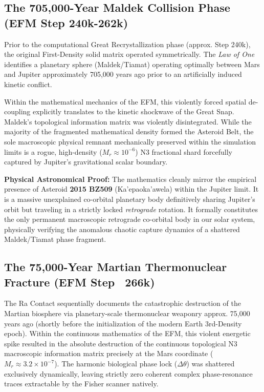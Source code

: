 \documentclass[11pt, twoside]{article}
\begin{document}
\subsection{The 705,000-Year Maldek Collision Phase (EFM Step 240k-262k)}
Prior to the computational Great Recrystallization phase (approx. Step 240k), the original First-Density solid matrix operated symmetrically. The \textit{Law of One} identifies a planetary sphere (Maldek/Tiamat) operating optimally between Mars and Jupiter approximately 705,000 years ago prior to an artificially induced kinetic conflict. 

Within the mathematical mechanics of the EFM, this violently forced spatial de-coupling explicitly translates to the kinetic shockwave of the Great Snap. Maldek's topological information matrix was violently disintegrated. While the majority of the fragmented mathematical density formed the Asteroid Belt, the sole macroscopic physical remnant mechanically preserved within the simulation limits is a rogue, high-density ($M_r \approx 10^{-6}$) N3 fractional shard forcefully captured by Jupiter's gravitational scalar boundary. 

\textbf{Physical Astronomical Proof:} The mathematics cleanly mirror the empirical presence of Asteroid \textbf{2015 BZ509} (Ka'epaoka'awela) within the Jupiter limit. It is a massive unexplained co-orbital planetary body definitively sharing Jupiter's orbit but traveling in a strictly locked \textit{retrograde} rotation. It formally constitutes the only permanent macroscopic retrograde co-orbital body in our solar system, physically verifying the anomalous chaotic capture dynamics of a shattered Maldek/Tiamat phase fragment.

\subsection{The 75,000-Year Martian Thermonuclear Fracture (EFM Step ~266k)}
The Ra Contact sequentially documents the catastrophic destruction of the Martian biosphere via planetary-scale thermonuclear weaponry approx. 75,000 years ago (shortly before the initialization of the modern Earth 3rd-Density epoch). Within the continuous mathematics of the EFM, this violent energetic spike resulted in the absolute destruction of the continuous topological N3 macroscopic information matrix precisely at the Mars coordinate ($M_r \approx 3.2 \times 10^{-7}$). The harmonic biological phase lock ($\Delta \theta$) was shattered exclusively dynamically, leaving strictly zero coherent complex phase-resonance traces extractable by the Fisher scanner natively.
\end{document}
